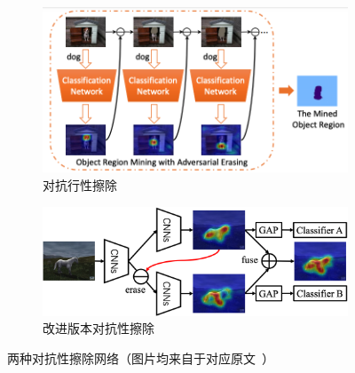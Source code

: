 \begin{figure}[h!]
	\centering
	\begin{subfigure}{0.38\textwidth}
		\centering
		\includegraphics[width=1.0\textwidth]{figure/adversarial_erasing}
        \caption{对抗行性擦除~\cite{WeiFLCZY17}}
		\label{subfig:adversarial_erasing}
	\end{subfigure}
	\begin{subfigure}{0.57\textwidth}
		\centering
		\includegraphics[width=1.0\textwidth]{figure/improved_adversarial_learning}
		\caption{改进版本对抗性擦除~\cite{ZhangWF0H18}}
		\label{subfig:improved_adversarial_learning}
	\end{subfigure}
	\caption{两种对抗性擦除网络（图片均来自于对应原文~\cite{WeiFLCZY17,ZhangWF0H18}）}
	\label{mul_fig:weakly_supervised_localization}
\end{figure}

